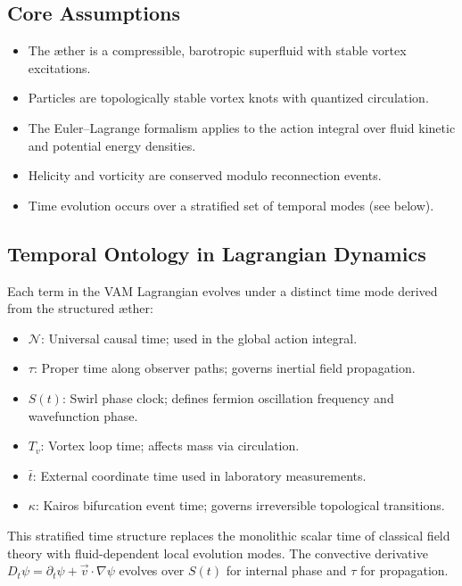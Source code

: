 \documentclass[12pt]{article}
\begin{document}
\subsection{Core Assumptions}
\begin{itemize}
    \item The \ae{}ther is a compressible, barotropic superfluid with stable vortex excitations.
    \item Particles are topologically stable vortex knots with quantized circulation.
    \item The Euler--Lagrange formalism applies to the action integral over fluid kinetic and potential energy densities.
    \item Helicity and vorticity are conserved modulo reconnection events.
    \item Time evolution occurs over a stratified set of temporal modes (see below).
\end{itemize}

\subsection*{Temporal Ontology in Lagrangian Dynamics}
Each term in the VAM Lagrangian evolves under a distinct time mode derived from the structured \ae{}ther:

\begin{itemize}
    \item \( \mathcal{N} \): Universal causal time; used in the global action integral.
    \item \( \tau \): Proper time along observer paths; governs inertial field propagation.
    \item \( S(t) \): Swirl phase clock; defines fermion oscillation frequency and wavefunction phase.
    \item \( T_v \): Vortex loop time; affects mass via circulation.
    \item \( \bar{t} \): External coordinate time used in laboratory measurements.
    \item \( \kappa \): Kairos bifurcation event time; governs irreversible topological transitions.
\end{itemize}

This stratified time structure replaces the monolithic scalar time of classical field theory with fluid-dependent local evolution modes. The convective derivative \( D_t \psi = \partial_t \psi + \vec{v} \cdot \nabla \psi \) evolves over \( S(t) \) for internal phase and \( \tau \) for propagation.
\end{document}

